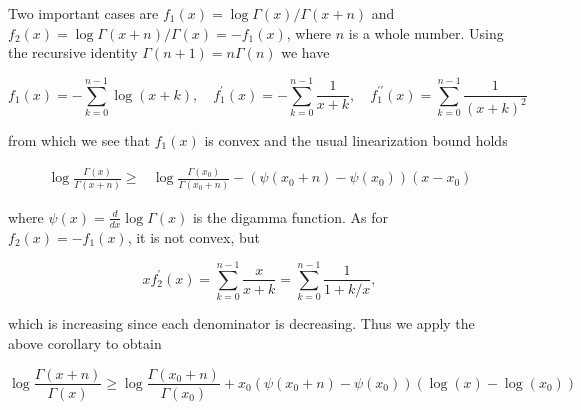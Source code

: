 \documentclass[nofootinbib,amssymb,amsmath]{revtex4}
\begin{document}
Two important cases are $f_1(x) = \log \Gamma(x) / \Gamma(x + n)$ and $f_2(x) = \log \Gamma(x + n) / \Gamma(x) = -f_1(x)$, where $n$ is a whole number.  Using the recursive identity $\Gamma(n+1) = n \Gamma(n)$ we have

\begin{equation}
f_1(x) = -\sum_{k=0}^{n-1} \log(x + k), \quad f^\prime_1(x) = -\sum_{k=0}^{n-1} \frac{1}{x+k}, \quad f_1^{\prime \prime}(x) = \sum_{k=0}^{n-1} \frac{1}{(x+k)^2}
\end{equation}

from which we see that $f_1(x)$ is convex and the usual linearization bound holds

\begin{align} \label{bound1}
\log \frac{ \Gamma(x) }{ \Gamma(x + n) } \ge & \log \frac{ \Gamma(x_0) }{ \Gamma(x_0 + n) } - \left( \psi(x_0 + n) - \psi(x_0) \right) (x - x_0)
\end{align}

where $\psi(x) = \frac{d}{dx} \log \Gamma(x)$ is the digamma function.  As for $f_2(x) = - f_1(x)$, it is not convex, but

\begin{equation}
x f_2^\prime(x) = \sum_{k=0}^{n-1} \frac{x}{x+k} = \sum_{k=0}^{n-1} \frac{1}{1+k/x},
\end{equation}

which is increasing since each denominator is decreasing.  Thus we apply the above corollary to obtain

\begin{equation} \label{bound2}
\log \frac{ \Gamma(x + n) }{ \Gamma(x) } \ge \log \frac{ \Gamma(x_0 + n) }{ \Gamma(x_0) } + x_0 \left( \psi(x_0 + n) - \psi(x_0) \right)  \left( \log(x) - \log(x_0) \right)
\end{equation}
\end{document}
